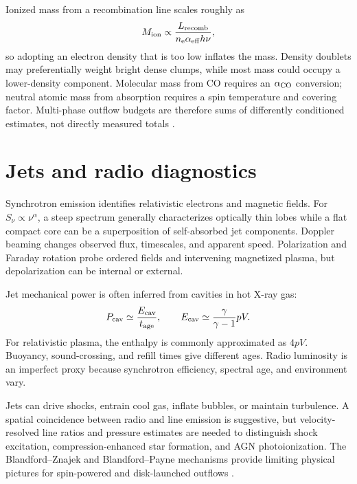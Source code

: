 Ionized mass from a recombination line scales roughly as
\begin{equation}
 M_{\rm ion}\propto
 \frac{L_{\rm recomb}}{n_{\rm e}\alpha_{\rm eff}h\nu},
\end{equation}
so adopting an electron density that is too low inflates the mass. Density
doublets may preferentially weight bright dense clumps, while most mass could
occupy a lower-density component. Molecular mass from CO requires an
$\alpha_{\rm CO}$ conversion; neutral atomic mass from absorption requires a
spin temperature and covering factor. Multi-phase outflow budgets are
therefore sums of differently conditioned estimates, not directly measured
totals \citep{Bolatto2013,Cicone2014}.

\section{Jets and radio diagnostics}

Synchrotron emission identifies relativistic electrons and magnetic fields.
For $S_\nu\propto\nu^{\alpha}$, a steep spectrum generally characterizes
optically thin lobes while a flat compact core can be a superposition of
self-absorbed jet components. Doppler beaming changes observed flux,
timescales, and apparent speed. Polarization and Faraday rotation probe
ordered fields and intervening magnetized plasma, but depolarization can be
internal or external.

Jet mechanical power is often inferred from cavities in hot X-ray gas:
\begin{equation}
 P_{\rm cav}\simeq \frac{E_{\rm cav}}{t_{\rm age}},
 \qquad
 E_{\rm cav}\simeq \frac{\gamma}{\gamma-1}pV.
\end{equation}
For relativistic plasma, the enthalpy is commonly approximated as $4pV$.
Buoyancy, sound-crossing, and refill times give different ages. Radio
luminosity is an imperfect proxy because synchrotron efficiency, spectral age,
and environment vary.

Jets can drive shocks, entrain cool gas, inflate bubbles, or maintain
turbulence. A spatial coincidence between radio and line emission is
suggestive, but velocity-resolved line ratios and pressure estimates are
needed to distinguish shock excitation, compression-enhanced star formation,
and AGN photoionization. The Blandford--Znajek and Blandford--Payne mechanisms
provide limiting physical pictures for spin-powered and disk-launched
outflows \citep{BlandfordZnajek1977,BlandfordPayne1982}.


